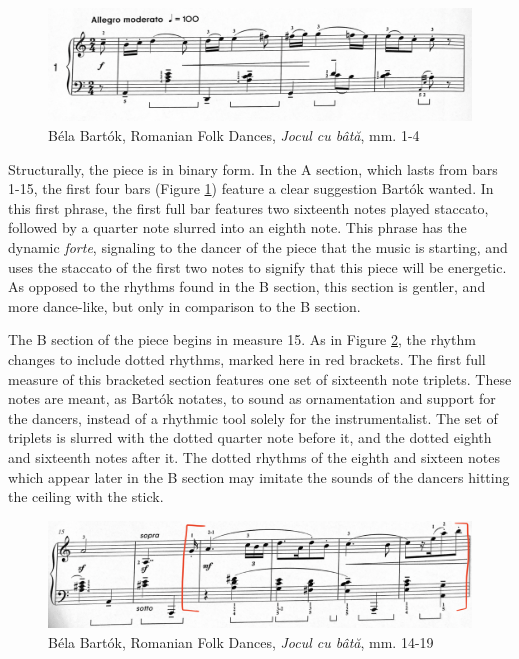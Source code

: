 \begin{figure}[h]
  \centering
  \includegraphics[width=\textwidth]{figures/bartok-stick-dance-first-line.jpg}
  \caption{Béla Bartók, Romanian Folk Dances, \textit{Jocul cu bâtă}, mm. 1-4}
  \label{fig:bartok-stick-dance-first-line}
\end{figure}


Structurally, the piece is in binary form. In the A section, which lasts from bars 1-15, the first four bars (Figure \ref{fig:bartok-stick-dance-first-line}\autocite{Lung_2016}) feature a clear suggestion Bartók wanted. In this first phrase, the first full bar features two sixteenth notes played staccato, followed by a quarter note slurred into an eighth note. This phrase has the dynamic \textit{forte}, signaling to the dancer of the piece that the music is starting, and uses the staccato of the first two notes to signify that this piece will be energetic. As opposed to the rhythms found in the B section, this section is gentler, and more dance-like, but only in comparison to the B section. 

The B section of the piece begins in measure 15. As in Figure \ref{fig:bartok-stick-dance-b-section}\autocite{Lung_2016}, the rhythm changes to include dotted rhythms, marked here in red brackets. The first full measure of this bracketed section features one set of sixteenth note triplets. These notes are meant, as Bartók notates, to sound as ornamentation and support for the dancers, instead of a rhythmic tool solely for the instrumentalist. The set of triplets is slurred with the dotted quarter note before it, and the dotted eighth and sixteenth notes after it. The dotted rhythms of the eighth and sixteen notes which appear later in the B section may imitate the sounds of the dancers hitting the ceiling with the stick.

\begin{figure}
  \centering
  \includegraphics[width=\textwidth]{figures/bartok-stick-dance-b-section.jpg}
  \caption{Béla Bartók, Romanian Folk Dances, \textit{Jocul cu bâtă}, mm. 14-19}
  \label{fig:bartok-stick-dance-b-section}
\end{figure}

